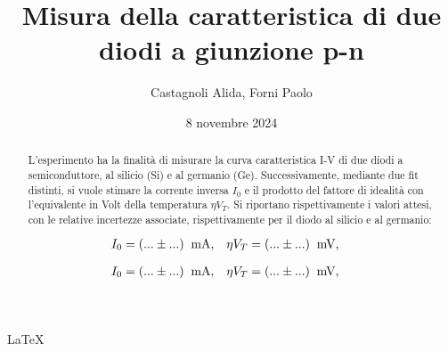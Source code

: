 \documentclass[11pt]{article}
\begin{document}
\LaTeX

\title{\textbf{Misura della caratteristica di due diodi a giunzione p-n}}
\author{Castagnoli Alida, Forni Paolo}
\date{8 novembre 2024}
\maketitle

\begin{abstract}
    L'esperimento ha la finalità di misurare la curva caratteristica I-V di due diodi a semiconduttore, al silicio (Si) e al germanio (Ge). 
    Successivamente, mediante due fit distinti, si vuole stimare la corrente inversa $I_{0}$ e il prodotto del fattore di idealità con l'equivalente in Volt della temperatura $\eta V_{T}$.  
    Si riportano rispettivamente i valori attesi, con le relative incertezze associate, rispettivamente per il diodo al silicio e al germanio:

    \begin{align*}
        I_{0} &= (... \pm ...) \;\;\textnormal{mA}, & 
        \eta V_{T} &= (... \pm ...)\;\;\textnormal{mV}, &
    \end{align*}

    \vspace{-0.6cm}

    \begin{align*}
        I_{0} &= (... \pm ...) \;\;\textnormal{mA}, & 
        \eta V_{T} &= (... \pm ...)\;\;\textnormal{mV}, &
    \end{align*}

\end{abstract}


\end{document}
